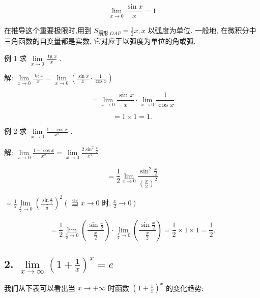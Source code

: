 \documentclass[lang=cn,newtx,10pt,scheme=chinese]{elegantbook}
\begin{document}
\[
\mathop{\lim }\limits_{{x \rightarrow 0}}\frac{\sin x}{x} = 1
\]

在推导这个重要极限时,用到 \({S}_{\text{扇形 }{OAP}} = \frac{1}{2}x,x\) 以弧度为单位. 一般地, 在微积分中三角函数的自变量都是实数, 它对应于以弧度为单位的角或弧.

例 1 求 \(\mathop{\lim }\limits_{{x \rightarrow 0}}\frac{\operatorname{tg}x}{x}\) .

解: \(\mathop{\lim }\limits_{{x \rightarrow 0}}\frac{\operatorname{tg}x}{x} = \mathop{\lim }\limits_{{x \rightarrow 0}}\left( {\frac{\sin x}{x} \cdot \frac{1}{\cos x}}\right)\)

\[
= \mathop{\lim }\limits_{{x \rightarrow 0}}\frac{\sin x}{x} \cdot \mathop{\lim }\limits_{{x \rightarrow 0}}\frac{1}{\cos x}
\]

\[
= 1 \times 1 = 1\text{.}
\]

例 2 求 \(\mathop{\lim }\limits_{{x \rightarrow 0}}\frac{1 - \cos x}{{x}^{2}}\) .

解: \(\mathop{\lim }\limits_{{x \rightarrow 0}}\frac{1 - \cos x}{{x}^{2}} = \mathop{\lim }\limits_{{x \rightarrow 0}}\frac{2{\sin }^{2}\frac{x}{2}}{{x}^{2}}\)

\[
= \frac{1}{2}\mathop{\lim }\limits_{{x \rightarrow 0}}\frac{{\sin }^{2}\frac{x}{2}}{{\left( \frac{x}{2}\right) }^{2}}
\]

\(= \frac{1}{2}\mathop{\lim }\limits_{{\frac{x}{2} \rightarrow 0}}{\left( \frac{\sin \frac{x}{2}}{\frac{x}{2}}\right) }^{2}\left( {\text{ 当 }x \rightarrow 0\text{ 时,}\;\frac{x}{2} \rightarrow 0}\right)\)

\[
= \frac{1}{2}\mathop{\lim }\limits_{{\frac{x}{2} \rightarrow 0}}\left( \frac{\sin \frac{x}{2}}{\frac{x}{2}}\right) \cdot \mathop{\lim }\limits_{{\frac{x}{2} \rightarrow 0}}\left( \frac{\sin \frac{x}{2}}{\frac{x}{2}}\right) = \frac{1}{2} \times 1 \times 1 = \frac{1}{2}\text{.}
\]

\subsection*{2. \(\mathop{\lim }\limits_{{x \rightarrow \infty }}{\left( 1 + \frac{1}{x}\right) }^{x} = e\)}

我们从下表可以看出当 \(x \rightarrow + \infty\) 时函数 \({\left( 1 + \frac{1}{x}\right) }^{x}\) 的变化趋势:
\end{document}
